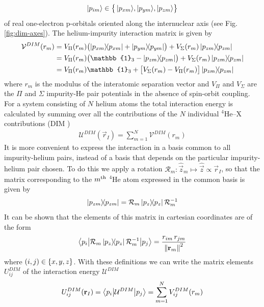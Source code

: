 			\begin{align}
				 \ket{p_{im}}\in\qty\big{\,\ket{p_{xm}}\!,\ket{p_{ym}}\!,\ket{p_{zm}}} \label{eq:dim-basis}
			\end{align}
			of real one-electron p-orbitals oriented along the internuclear axis (see Fig. \ref{fig:dim-axes}). The helium-impurity interaction matrix is given by
			\begin{align}
				\mathcal{V}^{DIM}(r_m) &= V_{\Pi}(r_m)\qty\big(\dyad{p_{xm}}+\dyad{p_{ym}})+V_{\Sigma}(r_m)\dyad{p_{zm}} \nonumber \\
					&= V_{\Pi}(r_m)\qty\big(\mathbb{1}_3-\dyad{p_{zm}})+V_{\Sigma}(r_m)\dyad{p_{zm}} \nonumber \\
					&=V_{\Pi}(r_m)\mathbb{1}_3+\qty\big[V_{\Sigma}(r_m)-V_{\Pi}(r_m)]\dyad{p_{zm}}
			\end{align}	
			where $r_m$ is the modulus of the interatomic separation vector and $V_\Pi$ and $V_\Sigma$ are the $\Pi$ and $\Sigma$ impurity-He pair potentials in the absence of spin-orbit coupling. For a system consisting of $N$ helium atoms the total interaction energy is calculated by summing over all the contributions of the $N$ individual $^4$He--X contributions (DIM \cite{82})
			\begin{align}
				\mathcal{U}^{DIM}(\vec{r}_I)=\sum_{m=1}^{N}\mathcal{V}^{DIM}(r_m)
			\end{align}
			It is more convenient to express the interaction in a basis common to all impurity-helium pairs, instead of a basis that depends on the particular impurity-helium pair chosen. To do this we apply a rotation $\mathcal{R}_m:\hat{\vec{z}}_m\mapsto\hat{\vec{z}}\propto\vec{r}_I$, so that the matrix corresponding to the $m^{\rm th}$ $^4$He atom expressed in the common basis is given by
			\begin{align}
				\dyad{p_{zm}} = \mathcal{R}_m\dyad{p_z}\mathcal{R}_m^{-1}
			\end{align}
			It can be shown that the elements of this matrix in cartesian coordinates are of the form
			\begin{equation}
				\mel**{p_i}{\mathcal{R}_m\dyad{p_z}\mathcal{R}_m^{-1}}{p_j} = \frac{r_{im}\,r_{jm}}{\norm{\vec{r}_m}^2}		\label{eq39}
			\end{equation}	
			where $(i,j)\in\qty{x,y,z}$. With these definitions we can write the matrix elements $U^{DIM}_{ij}$ of the interaction energy $\mathcal{U}^{DIM}$
			\begin{align}
				U^{DIM}_{ij}(\bm{\mathrm{r}}_I)=\mel**{p_i}{\mathcal{U}^{DIM}}{p_j} = \sum_{m=1}^{N} V^{DIM}_{ij}(r_m)
			\end{align}
